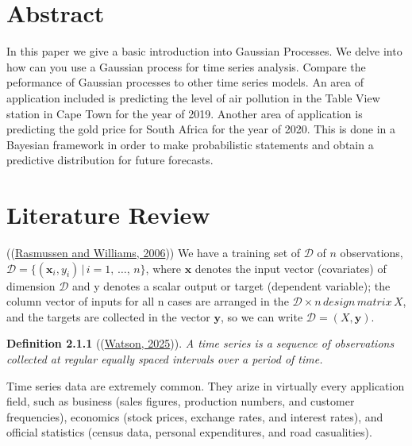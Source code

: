 \documentclass[a4paper, 10pt, fleqn]{article}
\begin{document}
   \begin{flushleft}

   \section*{Abstract}

    In this paper we give a basic introduction into Gaussian Processes. We delve into how can you use a Gaussian process for time series analysis. Compare the peformance of Gaussian processes to other time series models. An area of application included is predicting the level of air pollution in the Table View station in Cape Town for the year of 2019. Another area of application is predicting the gold price for South Africa for the year of 2020. This is done in a Bayesian framework in order to make probabilistic statements and obtain a predictive distribution for future forecasts.

   \section*{Literature Review}

      ((\hyperref[Rasmussen2006]{Rasmussen and Williams, 2006})) We have a training set of $\mathcal{D}$ of $n$ observations, $\mathcal{D} = \{(\mathbf{x}_{i}, y_{i}) \, | \, i = 1, \, \ldots, \, n\}$, where $\mathbf{x}$ denotes the input vector (covariates) of dimension $\mathcal{D}$ and y denotes a scalar output or target (dependent variable); the column vector of inputs for all n cases are arranged in the $\mathcal{D} \times n \, design \, matrix\, X$, and the targets are collected in the vector $\mathbf{y}$, so we can write $\mathcal{D} = (X, \mathbf{y})$. 

      \vspace{1em}

      \textbf{Definition 2.1.1} ((\hyperref[Watson2025]{Watson, 2025})). \textit{A time series is a sequence of observations collected at regular equally spaced intervals over a period of time.}

      \vspace{1em}

      Time series data are extremely common. They arize in virtually every application field, such as business (sales figures, production numbers, and customer frequencies), economics (stock prices, exchange rates, and interest rates), and official statistics (census data, personal expenditures, and road casualities).

      \vspace{1em}


\end{flushleft}
\end{document}
